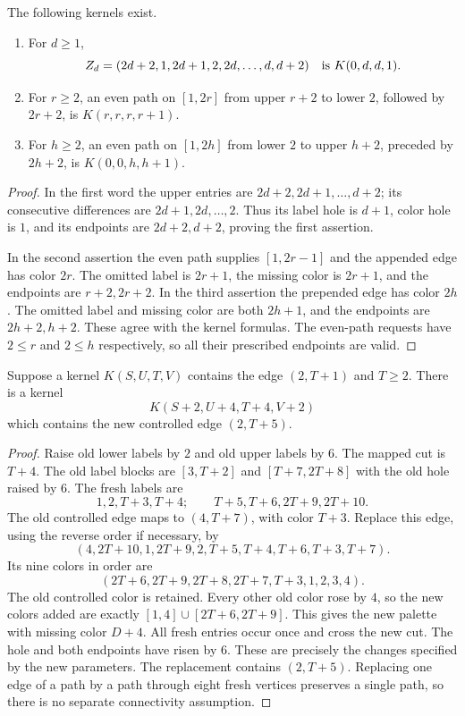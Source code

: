 \begin{lemma}\label{ok:elementary-seeds}
The following kernels exist.
\begin{enumerate}
\item For $d\ge1$,
\[
 Z_d=(2d+2,1,2d+1,2,2d,\ldots,d,d+2)
       \quad\hbox{is }K(0,d,d,1).
 \]
\item For $r\ge2$, an even path on $[1,2r]$ from upper $r+2$
to lower $2$, followed by $2r+2$, is
$K(r,r,r,r+1)$.
\item For $h\ge2$, an even path on $[1,2h]$ from lower $2$ to
upper $h+2$, preceded by $2h+2$, is $K(0,0,h,h+1)$.
\end{enumerate}
\end{lemma}
\begin{proof}
In the first word the upper entries are $2d+2,2d+1,\ldots,d+2$;
its consecutive differences are $2d+1,2d,\ldots,2$.
Thus its label hole is $d+1$, color hole is $1$, and its endpoints
are $2d+2,d+2$, proving the first assertion.

In the second assertion the even path supplies $[1,2r-1]$ and
the appended edge has color $2r$. The omitted label is $2r+1$,
the missing color is $2r+1$, and the endpoints are $r+2,2r+2$.
In the third assertion the prepended edge has color $2h$.
The omitted label and missing color are both $2h+1$, and the
endpoints are $2h+2,h+2$. These agree with the kernel formulas.
The even-path requests have $2\le r$ and $2\le h$ respectively,
so all their prescribed endpoints are valid.
\end{proof}

\begin{lemma}\label{ok:controlled-step}
Suppose a kernel $K(S,U,T,V)$ contains the edge $(2,T+1)$ and
$T\ge2$. There is a kernel
\[
 K(S+2,U+4,T+4,V+2)
 \]
which contains the new controlled edge $(2,T+5)$.
\end{lemma}
\begin{proof}
Raise old lower labels by $2$ and old upper labels by $6$.
The mapped cut is $T+4$. The old label blocks are $[3,T+2]$ and
$[T+7,2T+8]$ with the old hole raised by $6$. The fresh labels are
\[
 1,2,T+3,T+4;\qquad T+5,T+6,2T+9,2T+10.
 \]
The old controlled edge maps to $(4,T+7)$, with color $T+3$.
Replace this edge, using the reverse order if necessary, by
\begin{equation}
 (4,2T+10,1,2T+9,2,T+5,T+4,T+6,T+3,T+7).
 \label{ok:controlled-chain}
\end{equation}
Its nine colors in order are
\[
 (2T+6,2T+9,2T+8,2T+7,T+3,1,2,3,4).
 \]
The old controlled color is retained. Every other old color rose by
$4$, so the new colors added are exactly
$[1,4]\cup[2T+6,2T+9]$. This gives the new palette with missing
color $D+4$. All fresh entries occur once and cross the new cut.
The hole and both endpoints have risen by $6$.
These are precisely the changes specified by the new parameters.
The replacement contains $(2,T+5)$. Replacing one edge of a path
by a path through eight fresh vertices preserves a single path, so
there is no separate connectivity assumption.
\end{proof}

